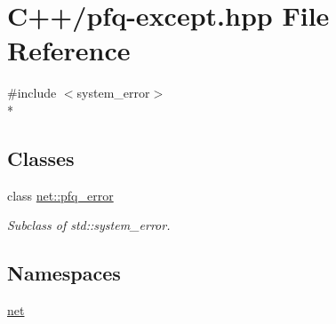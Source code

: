 \hypertarget{pfq-except_8hpp}{\section{C++/pfq-\/except.hpp File Reference}
\label{pfq-except_8hpp}
}
{\ttfamily \#include $<$system\+\_\+error$>$}\\*
\subsection*{Classes}
\begin{DoxyCompactItemize}
\item 
class \hyperlink{classnet_1_1pfq__error}{net\+::pfq\+\_\+error}
\begin{DoxyCompactList}\small\item\em Subclass of std\+::system\+\_\+error. \end{DoxyCompactList}\end{DoxyCompactItemize}
\subsection*{Namespaces}
\begin{DoxyCompactItemize}
\item 
 \hyperlink{namespacenet}{net}
\end{DoxyCompactItemize}
